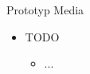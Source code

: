 \begin{Slide}{Prototyp Media}
\begin{itemize}
\item TODO
\begin{itemize}
\item ...


\end{itemize}
\end{itemize}
\end{Slide}